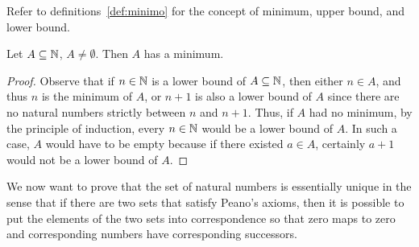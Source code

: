 Refer to definitions~\ref{def:minimo}
for the concept of minimum, upper bound, and lower bound.
%
\begin{theorem}
  \label{th:buon_ordinamento}
  Let $A\subseteq {\mathbb N}$, $A\neq \emptyset$. 
  Then $A$ has a minimum.
\end{theorem}
%
\begin{proof}
  Observe that if $n\in {\mathbb N}$ is a lower bound of $A\subseteq {\mathbb N}$, 
  then either $n\in A$, and thus $n$ is the minimum of $A$,
  or $n+1$ is also a lower bound of $A$ since 
  there are no natural numbers strictly between $n$ and $n+1$.
  Thus, if $A$ had no minimum, by the principle of induction, 
  every $n\in{\mathbb N}$ would be a lower bound of $A$.
  In such a case, $A$ would have to be empty because if there existed $a\in A$, 
  certainly $a+1$ would not be a lower bound of $A$.
\end{proof}

We now want to prove that the set of natural numbers is essentially 
unique in the sense that if there are two sets that satisfy Peano's 
axioms, then it is possible to put the elements of the two sets 
into correspondence so that zero maps to zero and corresponding numbers 
have corresponding successors.

